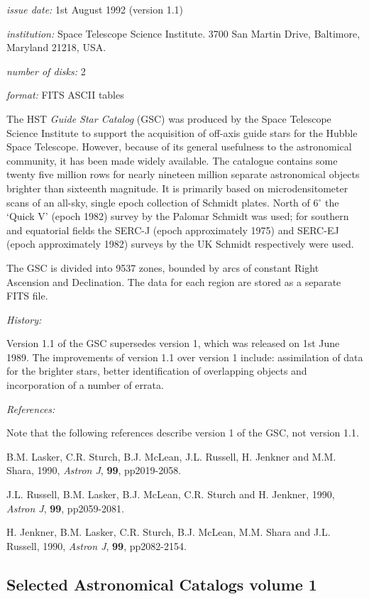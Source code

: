 \documentclass[twoside,11pt,nolof]{starlink}
\begin{document}
\textit{issue date:} 1st August 1992 (version 1.1)

\textit{institution:} Space Telescope Science Institute. 3700 San Martin
Drive, Baltimore, Maryland 21218, USA.

\textit{number of disks:} 2

\textit{format:} FITS ASCII tables

The HST \textit{Guide Star Catalog} (GSC) was produced by the Space
Telescope Science Institute to support the acquisition of off-axis
guide stars for the Hubble Space Telescope. However, because of its
general usefulness to the astronomical community, it has been made
widely available. The catalogue contains some twenty five million rows
for nearly nineteen million separate astronomical objects brighter than
sixteenth magnitude. It is primarily based on microdensitometer scans of
an all-sky, single epoch collection of Schmidt plates. North of
6$^{\circ}$ the `Quick V' (epoch 1982) survey by the Palomar Schmidt
was used; for southern and equatorial fields the SERC-J (epoch
approximately 1975) and SERC-EJ (epoch approximately 1982) surveys by
the UK Schmidt respectively were used.

The GSC is divided into 9537 zones, bounded by arcs of constant Right
Ascension and Declination. The data for each region are stored as a
separate FITS file.

\textit{History:}

Version 1.1 of the GSC supersedes version 1, which was released on
1st June 1989. The improvements of version 1.1 over version 1 include:
assimilation of data for the brighter stars, better identification of
overlapping objects and incorporation of a number of errata.

\textit{References:}

Note that the following references describe version 1 of the GSC, not
version 1.1.

B.M. Lasker, C.R. Sturch, B.J. McLean, J.L. Russell, H. Jenkner and
M.M. Shara, 1990, \textit{Astron J}, \textbf{99}, pp2019-2058.

J.L. Russell, B.M. Lasker, B.J. McLean, C.R. Sturch and H. Jenkner,
1990, \textit{Astron J}, \textbf{99}, pp2059-2081.

H. Jenkner, B.M. Lasker, C.R. Sturch, B.J. McLean, M.M. Shara and
J.L. Russell, 1990, \textit{Astron J}, \textbf{99}, pp2082-2154.

\subsection{Selected Astronomical Catalogs volume 1
\label{SAC}}
\end{document}
